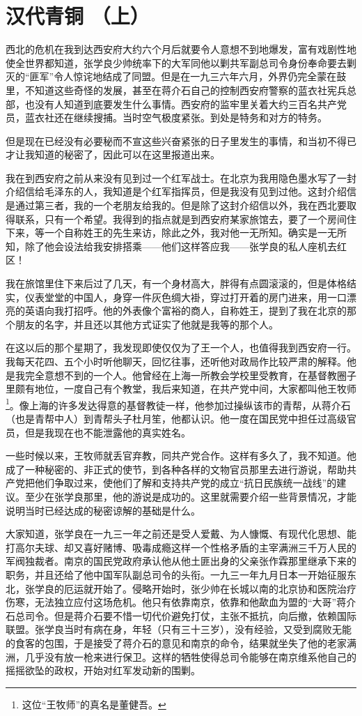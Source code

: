 \documentclass[10pt]{book}
\begin{document}
\section{汉代青铜 （上）}

西北的危机在我到达西安府大约六个月后就要令人意想不到地爆发，富有戏剧性地使全世界都知道，张学良少帅统率下的大军同他以剿共军副总司令身份奉命要去剿灭的“匪军”令人惊诧地结成了同盟。但是在一九三六年六月，外界仍完全蒙在鼓里，不知道这些奇怪的发展，甚至在蒋介石自己的控制西安府警察的蓝衣社宪兵总部，也没有人知道到底要发生什么事情。西安府的监牢里关着大约三百名共产党员，蓝衣社还在继续搜捕。当时空气极度紧张。到处是特务和对方的特务。

但是现在已经没有必要秘而不宣这些兴奋紧张的日子里发生的事情，和当初不得已才让我知道的秘密了，因此可以在这里报道出来。

我在到西安府之前从来没有见到过一个红军战士。在北京为我用隐色墨水写了一封介绍信给毛泽东的人，我知道是个红军指挥员，但是我没有见到过他。这封介绍信是通过第三者，我的一个老朋友给我的。但是除了这封介绍信以外，我在西北要取得联系，只有一个希望。我得到的指点就是到西安府某家旅馆去，要了一个房间住下来，等一个自称姓王的先生来访，除此之外，我对他一无所知。确实是一无所知，除了他会设法给我安排搭乘——他们这样答应我——张学良的私人座机去红区！

我在旅馆里住下来后过了几天，有一个身材高大，胖得有点圆滚滚的，但是体格结实，仪表堂堂的中国人，身穿一件灰色绸大褂，穿过打开着的房门进来，用一口漂亮的英语向我打招呼。他的外表像个富裕的商人，自称姓王，提到了我在北京的那个朋友的名字，并且还以其他方式证实了他就是我等的那个人。

在这以后的那个星期了，我发现即使仅仅为了王一个人，也值得我到西安府一行。我每天花四、五个小时听他聊天，回忆往事，还听他对政局作比较严肃的解释。他是我完全意想不到的一个人。他曾经在上海一所教会学校里受教育，在基督教圈子里颇有地位，一度自己有个教堂，我后来知道，在共产党中间，大家都叫他王牧师\footnote{这位“王牧师”的真名是董健吾。}。像上海的许多发达得意的基督教徒一样，他参加过操纵该市的青帮，从蒋介石（也是青帮中人）到青帮头子杜月笙，他都认识。他一度在国民党中担任过高级官员，但是我现在也不能泄露他的真实姓名。

一些时候以来，王牧师就丢官弃教，同共产党合作。这样有多久了，我不知道。他成了一种秘密的、非正式的使节，到各种各样的文物官员那里去进行游说，帮助共产党把他们争取过来，使他们了解和支持共产党的成立“抗日民族统一战线”的建议。至少在张学良那里，他的游说是成功的。这里就需要介绍一些背景情况，才能说明当时已经达成的秘密谅解的基础是什么。

大家知道，张学良在一九三一年之前还是受人爱戴、为人慷慨、有现代化思想、能打高尔夫球、却又喜好赌博、吸毒成瘾这样一个性格矛盾的主宰满洲三千万人民的军阀独裁者。南京的国民党政府承认他从他土匪出身的父亲张作霖那里继承下来的职务，并且还给了他中国军队副总司令的头衔。一九三一年九月日本一开始征服东北，张学良的厄运就开始了。侵略开始时，张少帅在长城以南的北京协和医院治疗伤寒，无法独立应付这场危机。他只有依靠南京，依靠和他歃血为盟的“大哥”蒋介石总司令。但是蒋介石要不惜一切代价避免打仗，主张不抵抗，向后撤，依赖国际联盟。张学良当时有病在身，年轻（只有三十三岁），没有经验，又受到腐败无能的食客的包围，于是接受了蒋介石的意见和南京的命令，结果就坐失了他的老家满洲，几乎没有放一枪来进行保卫。这样的牺牲使得总司令能够在南京维系他自己的摇摇欲坠的政权，开始对红军发动新的围剿。
\end{document}
